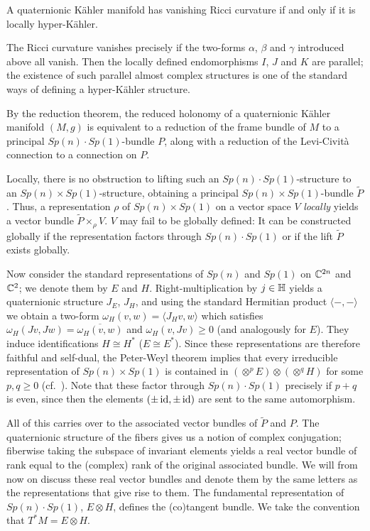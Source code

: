 \begin{cor}
	A quaternionic K\"ahler manifold has vanishing Ricci curvature if and only if it is locally hyper-K\"ahler.
\end{cor}
\begin{myproof}
	The Ricci curvature vanishes precisely if the two-forms $\alpha$, $\beta$ and $\gamma$ introduced above all vanish. Then the locally defined endomorphisms $I$, $J$ and $K$ are parallel; the existence of such parallel almost complex structures is one of the standard ways of defining a hyper-K\"ahler structure.
\end{myproof}

By the reduction theorem, the reduced holonomy of a quaternionic K\"ahler manifold $(M,g)$ is equivalent to a reduction of the frame bundle of $M$ to a principal $Sp(n)\cdot Sp(1)$-bundle $P$, along with a reduction of the Levi-Civit\`a connection to a connection on $P$. 

Locally, there is no obstruction to lifting such an $Sp(n)\cdot Sp(1)$-structure to an $Sp(n)\times Sp(1)$-structure, obtaining a principal $Sp(n)\times Sp(1)$-bundle $\tilde P$. Thus, a representation $\rho$ of $Sp(n)\times Sp(1)$ on a vector space $V$ \emph{locally} yields a vector bundle $\tilde P\times_\rho V$. $V$ may fail to be globally defined: It can be constructed globally if the representation factors through $Sp(n)\cdot Sp(1)$ or if the lift $\tilde P$ exists globally.

Now consider the standard representations of $Sp(n)$ and $Sp(1)$ on $\mathbb{C}^{2n}$ and $\mathbb{C}^2$; we denote them by $E$ and $H$. Right-multiplication by $j\in \mathbb{H}$ yields a quaternionic structure $J_E$, $J_H$, and using the standard Hermitian product $\langle-,-\rangle$ we obtain a two-form $\omega_H(v,w)=\langle J_H v,w\rangle$ which satisfies $\omega_H(Jv,Jw)=\overline{\omega_H(v,w)}$ and $\omega_H(v,Jv)\geq 0$ (and analogously for $E$). They induce identifications $H\cong H^*$ ($E\cong E^*$). Since these representations are therefore faithful and self-dual, the Peter-Weyl theorem implies that every irreducible representation of $Sp(n)\times Sp(1)$ is contained in $(\otimes^p E)\otimes(\otimes^q H)$ for some $p,q\geq 0$ (cf.~\cite[Thm. III.4.4]{BT1982}). Note that these factor through $Sp(n)\cdot Sp(1)$ precisely if $p+q$ is even, since then the elements $(\pm \operatorname{id},\pm \operatorname{id})$ are sent to the same automorphism. 

All of this carries over to the associated vector bundles of $\tilde P$ and $P$. The quaternionic structure of the fibers gives us a notion of complex conjugation; fiberwise taking the subspace of invariant elements yields a real vector bundle of rank equal to the (complex) rank of the original associated bundle. We will from now on discuss these real vector bundles and denote them by the same letters as the representations that give rise to them. The fundamental representation of $Sp(n)\cdot Sp(1)$, $E\otimes H$, defines the (co)tangent bundle. We take the convention that $T^*M=E\otimes H$.


